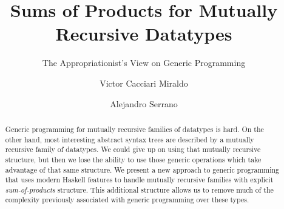 \documentclass[screen,sigplan]{acmart}%
\begin{document}
\title[Sums of Products for Mutually Recursive Datatypes]{Sums of Products for Mutually Recursive Datatypes}
\subtitle{The Appropriationist's View on Generic Programming}



\author{Victor Cacciari Miraldo}

\author{Alejandro Serrano}


\begin{abstract} 
  Generic programming for mutually recursive families
of datatypes is hard.
On the other hand, most interesting abstract syntax trees
are described by a mutually recursive family of datatypes.
We could give up on using that mutually
recursive structure, but then we lose the ability to use
those generic operations which take advantage of that
same structure. We present a new approach to generic programming that uses
modern Haskell features to handle mutually recursive families with
explicit \emph{sum-of-products} structure. This additional structure allows
us to remove much of the complexity previously associated with generic
programming over these types.
\end{abstract}
\end{document}
